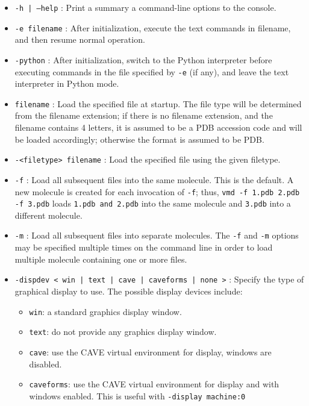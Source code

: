 \begin{itemize}
  \item {\tt -h | --help} : 
     Print a summary a command-line options to the console. 
  \item {\tt -e filename} : 
     After initialization, execute the text commands in filename, and
     then resume normal operation. 
  \item {\tt -python} :
     After initialization, switch to the Python interpreter before executing
     commands in the file specified by {\tt -e} (if any), and leave the text 
     interpreter in Python mode. 
  \item {\tt filename} :
     Load the specified file at startup.  The file type will be determined
     from the filename extension; if there is no filename extension, and
     the filename contains 4 letters, it is assumed to be a PDB accession
     code and will be loaded accordingly; otherwise the format is assumed
     to be PDB.
  \item {\tt -<filetype> filename} :
     Load the specified file using the given filetype.
  \item {\tt -f} :
    Load all subsequent files into the same molecule.  This is the default.
    A new molecule is created for each invocation of {\tt -f}; thus,
    {\tt vmd -f 1.pdb 2.pdb -f 3.pdb} loads {\tt 1.pdb and 2.pdb} into the
    same molecule and {\tt 3.pdb} into a different molecule.
  \item {\tt -m} :
    Load all subsequent files into separate molecules.  The {\tt -f} and
    {\tt -m} options may be specified multiple times on the command line
    in order to load multiple molecule containing one or more files.
  \item {\tt -dispdev < win | text | cave | caveforms | none >} : 
   Specify the type of graphical display to use. The possible display devices
   include: 
     \begin{itemize}
       \item {\tt win}: a standard graphics display window.
       \item {\tt text}: do not provide any graphics display window. 
       \item {\tt cave}: use the CAVE virtual environment for display,
                         windows are disabled.
       \item {\tt caveforms}: use the CAVE virtual environment for display
          and with windows enabled.  This is useful with {\tt -display machine:0}

\end{itemize}
\end{itemize}
